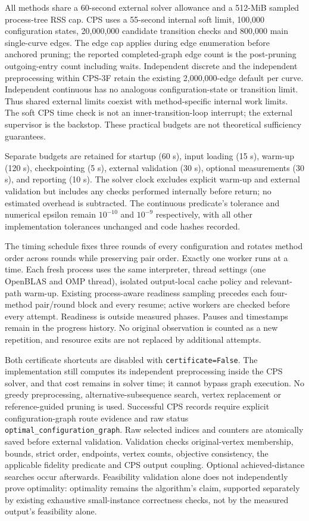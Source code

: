 All methods share a 60-second external solver allowance and a 512-MiB sampled process-tree RSS cap. CPS uses a 55-second internal soft limit, 100,000 configuration states, 20,000,000 candidate transition checks and 800,000 main single-curve edges. The edge cap applies during edge enumeration before anchored pruning; the reported completed-graph edge count is the post-pruning outgoing-entry count including waits. Independent discrete and the independent preprocessing within CPS-3F retain the existing 2,000,000-edge default per curve. Independent continuous has no analogous configuration-state or transition limit. Thus shared external limits coexist with method-specific internal work limits. The soft CPS time check is not an inner-transition-loop interrupt; the external supervisor is the backstop. These practical budgets are not theoretical sufficiency guarantees.

Separate budgets are retained for startup (60 s), input loading (15 s), warm-up (120 s), checkpointing (5 s), external validation (30 s), optional measurements (30 s), and reporting (10 s). The solver clock excludes explicit warm-up and external validation but includes any checks performed internally before return; no estimated overhead is subtracted. The continuous predicate's tolerance and numerical epsilon remain $10^{-10}$ and $10^{-9}$ respectively, with all other implementation tolerances unchanged and code hashes recorded.

The timing schedule fixes three rounds of every configuration and rotates method order across rounds while preserving pair order. Exactly one worker runs at a time. Each fresh process uses the same interpreter, thread settings (one OpenBLAS and OMP thread), isolated output-local cache policy and relevant-path warm-up. Existing process-aware readiness sampling precedes each four-method pair/round block and every resume; active workers are checked before every attempt. Readiness is outside measured phases. Pauses and timestamps remain in the progress history. No original observation is counted as a new repetition, and resource exits are not replaced by additional attempts.

Both certificate shortcuts are disabled with \texttt{certificate=False}. The implementation still computes its independent preprocessing inside the CPS solver, and that cost remains in solver time; it cannot bypass graph execution. No greedy preprocessing, alternative-subsequence search, vertex replacement or reference-guided pruning is used. Successful CPS records require explicit configuration-graph route evidence and raw status \texttt{optimal\_configuration\_graph}. Raw selected indices and counters are atomically saved before external validation. Validation checks original-vertex membership, bounds, strict order, endpoints, vertex counts, objective consistency, the applicable fidelity predicate and CPS output coupling. Optional achieved-distance searches occur afterwards. Feasibility validation alone does not independently prove optimality: optimality remains the algorithm's claim, supported separately by existing exhaustive small-instance correctness checks, not by the measured output's feasibility alone.

